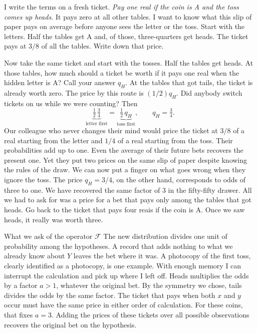 I write the terms on a fresh ticket. \emph{Pay one real if the coin is A and the toss comes up heads.} It pays zero at all other tables. I want to know what this slip of paper pays on average before anyone sees the letter or the toss. Start with the letters. Half the tables get A and, of those, three-quarters get heads. The ticket pays at $3/8$ of all the tables. Write down that price.

Now take the same ticket and start with the tosses. Half the tables get heads. At those tables, how much should a ticket be worth if it pays one real when the hidden letter is A? Call your answer $q_H$. At the tables that got tails, the ticket is already worth zero. The price by this route is $(1/2)q_H$. Did anybody switch tickets on us while we were counting? Then
\[
       \underbrace{\tfrac12\,\tfrac34}_{\text{letter first}}
       =\underbrace{\tfrac12\,q_H}_{\text{toss first}},
       \qquad q_H=\tfrac34 .
\]
Our colleague who never changes their mind would price the ticket at $3/8$ of a real starting from the letter and $1/4$ of a real starting from the toss. Their probabilities add up to one. Even the average of their future bets recovers the present one. Yet they put two prices on the same slip of paper despite knowing the rules of the draw. We can now put a finger on what goes wrong when they ignore the toss. The price $q_H=3/4$, on the other hand, corresponds to odds of three to one. We have recovered the same factor of 3 in the fifty-fifty drawer. All we had to ask for was a price for a bet that pays only among the tables that got heads. Go back to the ticket that pays four reais if the coin is A. Once we saw heads, it really was worth three.

\begin{quadro}{What we ask of the operator \(\mathcal F\)}
 The new distribution divides one unit of probability among the hypotheses. A record that adds nothing to what we already know about $Y$ leaves the bet where it was. A photocopy of the first toss, clearly identified as a photocopy, is one example. With enough memory I can interrupt the calculation and pick up where I left off.
 Heads multiplies the odds by a factor $a>1$, whatever the original bet. By the symmetry we chose, tails divides the odds by the same factor.
 The ticket that pays when both $x$ and $y$ occur must have the same price in either order of calculation. For these coins, that fixes $a=3$. Adding the prices of these tickets over all possible observations recovers the original bet on the hypothesis.
\end{quadro}

